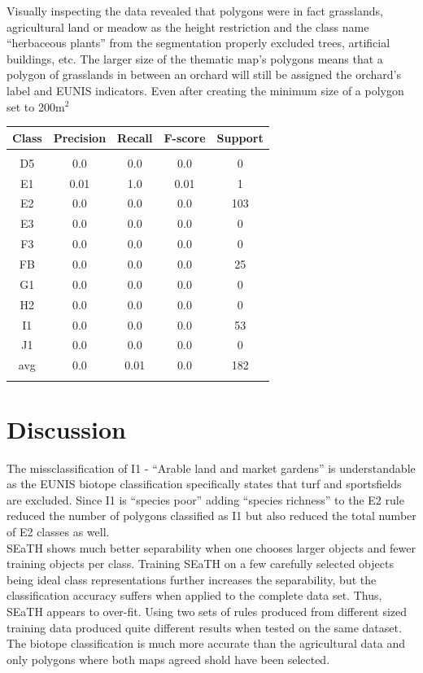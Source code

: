\documentclass[authoryear, review,12pt,number]{elsarticle}
\begin{document}
Visually inspecting the data revealed that polygons were in fact grasslands, 
agricultural land or meadow as the height restriction and the class name 
``herbaceous plants'' from the segmentation properly excluded trees, artificial 
buildings, etc. The larger size of the thematic map's 
polygons means that a polygon of grasslands in between an orchard will still be 
assigned the orchard's label and EUNIS indicators. Even after creating the 
minimum size of a polygon set to 200m$^{2}$
\begin{tabular}{c c c c c}
Class & Precision & Recall & F-score & Support\\
\hline\\
D5 & 0.0 & 0.0 & 0.0 & 0\\
E1 & 0.01 & 1.0 & 0.01 & 1\\
E2 & 0.0 & 0.0 & 0.0 & 103\\
E3 & 0.0 & 0.0 & 0.0 & 0\\
F3 & 0.0 & 0.0 & 0.0 & 0\\
FB & 0.0 & 0.0 & 0.0 & 25\\
G1 & 0.0 & 0.0 & 0.0 & 0\\
H2 & 0.0 & 0.0 & 0.0 & 0\\
I1 & 0.0 & 0.0 & 0.0 & 53\\
J1 & 0.0 & 0.0 & 0.0 & 0\\
avg & 0.0 & 0.01 & 0.0 & 182\\
\label{fig_dry_classification}
\end{tabular}

\section{Discussion}
The missclassification of I1 - ``Arable land and market gardens'' is 
understandable as the EUNIS biotope classification specifically states that 
turf and sportsfields are excluded. Since I1 is ``species poor'' adding 
``species richness'' to the E2 rule reduced the number of polygons classified 
as I1 but also reduced the total number of E2 classes as well.\\
SEaTH shows much better separability when one chooses
larger objects and fewer training objects per class. Training SEaTH on a few
carefully selected objects being ideal class representations further increases
the separability, but the classification accuracy suffers when applied to the
complete data set. Thus, SEaTH appears to over-fit. Using two sets of rules
produced from different sized training data produced quite different results
when tested on the same dataset.
The biotope classification is much more accurate than the agricultural data and 
only polygons where both maps agreed shold have been selected.
\end{document}
